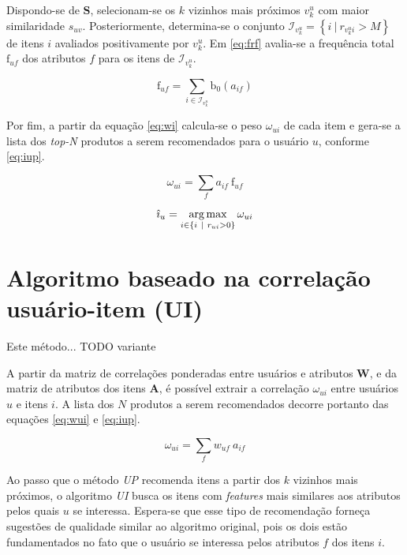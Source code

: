 Dispondo-se de $\mathbf{S}$, selecionam-se os $k$ vizinhos mais próximos $v_k^u$ com maior similaridade $s_{uv}$.  Posteriormente, determina-se o conjunto $\mathcal{I}_{v_k^u} = \left\{ i ~|~ r_{v_k^u i} > M\right\}$ de itens $i$ avaliados positivamente por $v_k^u$. Em \ref{eq:frf} avalia-se a frequência total $\mathrm{f}_{uf}$ dos atributos $f$ para os itens de $\mathcal{I}_{v_k^u}$. 

\begin{equation}
\label{eq:frf} 
\mathrm{f}_{uf} = \sum_{i \in \mathcal{I}_{v_k^u}}{\mathrm{b}_0\left(a_{if}\right)}
\end{equation} 

Por fim, a partir da equação \ref{eq:wi} calcula-se o peso $\omega_{ui}$ de cada item e gera-se a lista dos \textit{top-N} produtos a serem recomendados para o usuário $u$, conforme \ref{eq:iup}. 

\begin{equation}
\label{eq:wi} 
    \omega_{ui} = \sum_{f}{a_{if}~\mathrm{f}_{uf}}
\end{equation} 

\begin{equation}
\label{eq:iup} 
    \hat{\imath}_u = \operatorname*{arg\,max}_{i \in \left\{i~|~r_{ui} > 0\right\}}{\omega_{ui}}
\end{equation} 

\section{Algoritmo baseado na correlação usuário-item (UI)} %
\label{sec:algoritmo_baseado_na_correla_o_usu_rio_item_ui_}

Este método... TODO variante

A partir da matriz de correlações ponderadas entre usuários e atributos $\mathbf{W}$, e da matriz de atributos dos itens $\mathbf{A}$, é possível extrair a correlação $\omega_{ui}$ entre usuários $u$ e itens $i$. A lista dos $N$ produtos a serem recomendados decorre portanto das equações \ref{eq:wui} e \ref{eq:iup}.

\begin{equation}
\label{eq:wui} 
    \omega_{ui} = \sum_{f}{w_{uf}~a_{if}}
\end{equation} 

Ao passo que o método \textit{UP} recomenda itens a partir dos $k$ vizinhos mais próximos, o algoritmo \textit{UI} busca os itens com \textit{features} mais similares aos atributos pelos quais $u$ se interessa. Espera-se que esse tipo de recomendação forneça sugestões de qualidade similar ao algoritmo original, pois os dois estão fundamentados no fato que o usuário se interessa pelos atributos $f$ dos itens $i$. 


